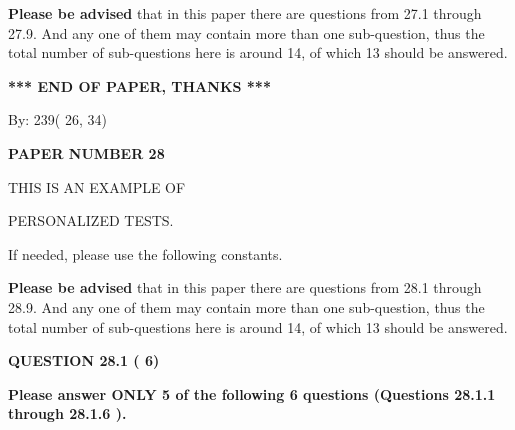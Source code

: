 \documentclass[12pt]{article}
\begin{document}
{\textbf{\large{Please be advised}}} that in this paper there are questions from
27.1 through
27.9.
And any one of them may contain more than one sub-question, thus the total number
of sub-questions here is around 14, of which
13 should be answered.
 
   
   
   
   
\vspace{1.0in} 
{\textbf{\large{ *** END OF PAPER, THANKS *** }}} 
   
   
\hspace{1.0in} By: 
         239(         26,          34)
   
   
   
   
\newpage 
\setcounter{page}{ 
    28001 } 
   
   
   
   
 {\textbf{ \Large{ PAPER NUMBER          28 }}}
   
   
\vspace{0.2in}
   
   
   
   
   
   
 \vspace{0.2in}
 
 
{\Huge  THIS IS AN EXAMPLE OF}
 
{\Huge  PERSONALIZED TESTS. }
 
If needed, please use the following constants.
 
 
 
{\textbf{\large{Please be advised}}} that in this paper there are questions from
28.1 through
28.9.
And any one of them may contain more than one sub-question, thus the total number
of sub-questions here is around 14, of which
13 should be answered.
 
\vspace{0.3in}
 
 
   
   
  
\vspace{0.2in}
  
{\textbf{\Large{QUESTION
28.1 
 (          6)
}}}
  
  
{\textbf{\Large{Please answer ONLY  %
           5 %
 of the following  %
           6 %
 questions (Questions  %
28.1.1 %
 through  %
28.1.6 %
 ). }}}
   
   
  
\end{document}
